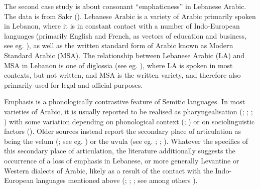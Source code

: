 \documentclass[
  man,
  longtable,
  nolmodern,
  notxfonts,
  notimes,
  colorlinks=true,linkcolor=blue,citecolor=blue,urlcolor=blue]{apa7}
\begin{document}
The second case study is about consonant ``emphaticness'' in Lebanese
Arabic. The data is from Sakr (). Lebanese
Arabic is a variety of Arabic primarily spoken in Lebanon, where it is
in constant contact with a number of Indo-European languages (primarily
English and French, as vectors of education and business, see eg.
), as well as the
written standard form of Arabic known as Modern Standard Arabic (MSA).
The relationship between Lebanese Arabic (LA) and MSA in Lebanon is one
of diglossia (see eg. ), where LA is
spoken in most contexts, but not written, and MSA is the written
variety, and therefore also primarily used for legal and official
purposes.

Emphasis is a phonologically contrastive feature of Semitic languages.
In most varieties of Arabic, it is usually reported to be realised as
pharyngealisation (;
; ; ) with some
variation depending on phonological context
(;
) or on sociolinguistic factors
(). Older sources
instead report the secondary place of articulation as being the velum
(; see eg.
) or the uvula (see eg.
;
;
). Whatever the specifics of
this secondary place of articulation, the literature additionally
suggests the occurrence of a loss of emphasis in Lebanese, or more
generally Levantine or Western dialects of Arabic, likely as a result of
the contact with the Indo-European languages mentioned above
(;
;
; see among others
).
\end{document}
